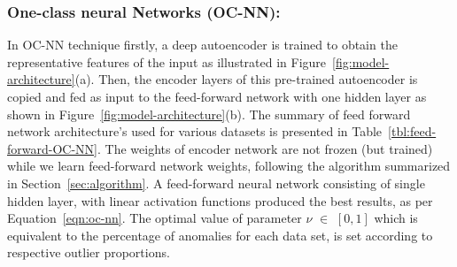 {%
\subsubsection{ {One-class neural Networks (OC-NN):}}
\label{model_architecture}
In OC-NN technique firstly, a deep autoencoder is trained to obtain the representative features of the input as illustrated in Figure~\ref{fig:model-architecture}(a). Then, the encoder layers of this pre-trained autoencoder is copied and fed as input to the feed-forward network with one hidden layer as shown in Figure~\ref{fig:model-architecture}(b). The summary of feed forward network architecture's used for various datasets is presented in Table~\ref{tbl:feed-forward-OC-NN}. The weights of encoder network are not frozen (but trained) while we learn feed-forward network weights, following the algorithm summarized in Section~\ref{sec:algorithm}. A feed-forward neural network consisting of single hidden layer, with  linear activation functions produced the best results, as per Equation~\ref{eqn:oc-nn}.  The optimal value of parameter $\nu$ $\in$ ${[0, 1]}$ which is equivalent to the percentage of anomalies for each data set, is set according to respective outlier proportions.

\vspace{-0.2cm}

}

